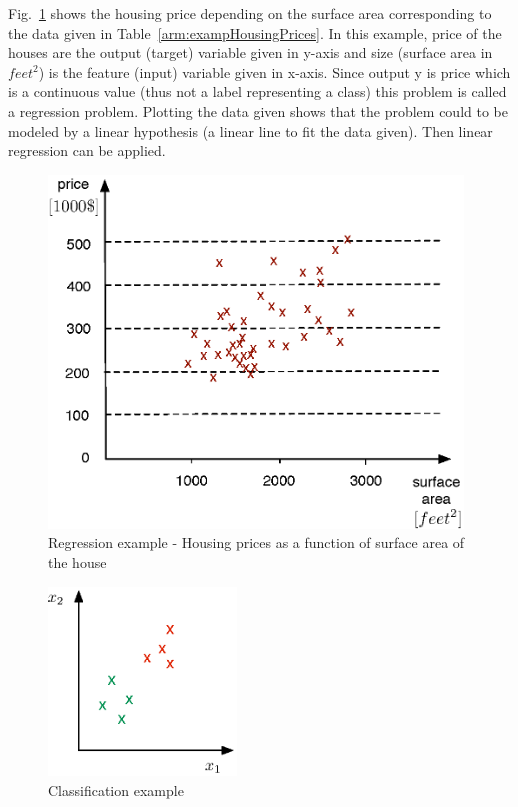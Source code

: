 Fig.~\ref{fig:housingPrices} shows the housing price depending on the surface area corresponding to the data given in Table~\ref{arm:exampHousingPrices}.
In this example, price of the houses are the output (target) variable given in y-axis and size (surface area in $feet^2$) is the feature (input) variable given in x-axis. 
Since output y is price which is a continuous value (thus not a label representing a class) this problem is called a regression problem. Plotting the data given shows that the problem could to be modeled by a linear hypothesis (a linear line to fit the data given). Then linear regression can be applied.

\begin{figure}
\begin{center}
\includegraphics[width=11cm]{figures/linearRegressionExamp}    %
\caption{Regression example - Housing prices as a function of surface area of the house \cite{andrewNg_MachLearning}} 
\label{fig:housingPrices}
\end{center}
\end{figure}

\begin{figure}
\begin{center}
\includegraphics[width=5cm]{figures/classificationEx2}    %
\caption{Classification example} 
\label{fig:classificationEx2}
\end{center}
\end{figure}

